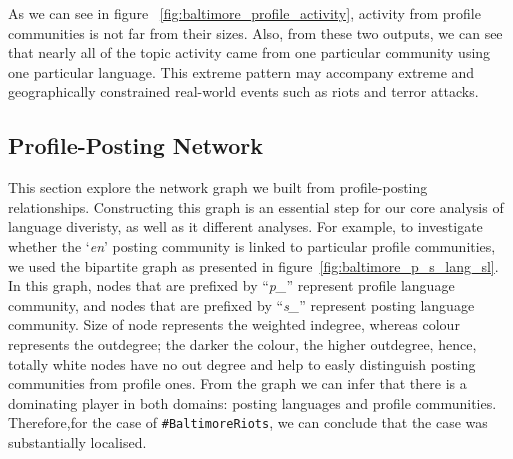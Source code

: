 As we can see in figure ~\ref{fig:baltimore_profile_activity}, 
activity from profile communities is not far from their sizes.
Also, from these two outputs, we can see that nearly all of the topic
activity came from one particular community using one particular
language. This extreme pattern may accompany extreme and
geographically constrained real-world events such as riots and terror
attacks.

\subsection{Profile-Posting Network}

This section explore the network graph we built from profile-posting relationships.
Constructing this graph is an essential step for our core analysis of language 
diveristy, as well as it different analyses. For example, to investigate whether 
the `{\emph{en}}' posting community is linked to particular profile communities, 
we used the bipartite graph as presented in figure~\ref{fig:baltimore_p_s_lang_sl}. 
In this graph, nodes that are prefixed by ``{\emph{p\_}}'' represent profile language 
community, and nodes that are prefixed by ``{\emph{s\_}}'' represent posting language
community. Size of node represents the weighted indegree, whereas colour
represents the outdegree; the darker the colour, the higher
outdegree, hence, totally white nodes have no out degree and help to easly 
distinguish posting communities from profile ones. From the graph 
we can infer that there is a dominating player in both domains: posting languages and profile communities.
Therefore,for the case of {\texttt{\#BaltimoreRiots}}, we can conclude that the case was
substantially localised.


